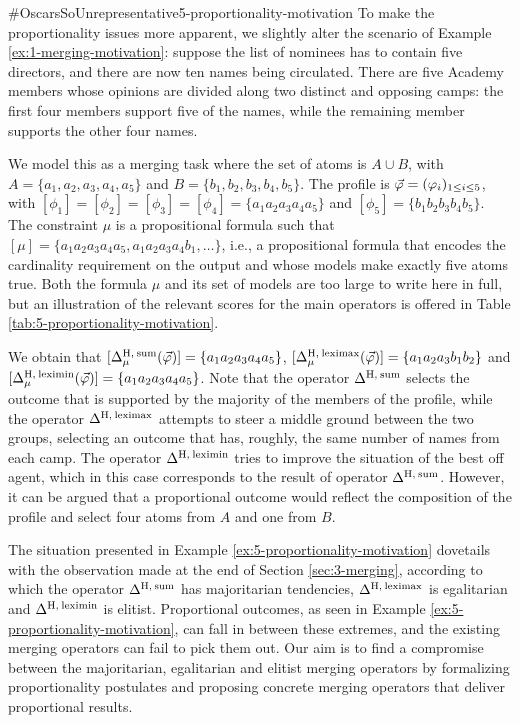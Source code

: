 \begin{xmpl}{$\#$OscarsSoUnrepresentative}{5-proportionality-motivation}
	To make the proportionality issues more apparent, 
	we slightly alter the scenario of Example \ref{ex:1-merging-motivation}: 
	suppose the list of nominees has to contain five directors, and there 
	are now ten names being circulated.
	There are five Academy members whose opinions
	are divided along two distinct and opposing camps:
	the first four members support five of the names,
	while the remaining member supports the other four names.

	We model this as a merging task where the set of atoms is $A\cup B$,
	with $A=\{a_1,a_2,a_3,a_4,a_5\}$ and $B=\{b_1,b_2,b_3,b_4,b_5\}$.
	The profile is $\P=(\phi_i)_{1\le i \le 5}$,
	with $[\phi_1]=[\phi_2]=[\phi_3]=[\phi_4]=\{a_1a_2a_3a_4a_5\}$
	and $[\phi_5]=\{b_1b_2b_3b_4b_5\}$.
	The constraint $\mu$ is a propositional formula 
	such that $[\mu]=\{a_1a_2a_3a_4a_5,a_1a_2a_3a_4b_1,\dots\}$,
	i.e., a propositional formula that encodes
	the cardinality requirement on the output and 
	whose models make exactly five atoms true.
	Both the formula $\mu$ and its set of models are too large 
	to write here in full, but an illustration of the relevant scores 
	for the main operators is offered in Table \ref{tab:5-proportionality-motivation}. 

	We obtain that
	$[\me^{\hamming,\:\ssum}_{\mu}(\P)]=\{a_1a_2a_3a_4a_5\}$,
	$[\me^{\hamming,\:\leximax}_{\mu}(\P)]=\{a_1a_2a_3b_1b_2\}$
	and 
	$[\me^{\hamming,\:\leximin}_{\mu}(\P)]=\{a_1a_2a_3a_4a_5\}$.
	Note that the operator $\me^{\hamming,\:\ssum}$ selects the outcome 
	that is supported by the majority of the members of the profile,
	while the operator $\me^{\hamming,\:\leximax}$ attempts to steer 
	a middle ground between the two groups, selecting an outcome
	that has, roughly, the same number of names from each camp.
	The operator $\me^{\hamming,\:\leximin}$ tries to improve
	the situation of the best off agent,
	which in this case corresponds to the result of operator 
	$\me^{\hamming,\:\ssum}$.
	However, it can be argued that a proportional outcome would 
	reflect the composition of the profile 
	and select four atoms from $A$ and one from $B$.
\end{xmpl}

The situation presented in Example \ref{ex:5-proportionality-motivation}
dovetails with the observation made at the end of Section \ref{sec:3-merging},
according to which the operator $\me^{\hamming,\:\ssum}$ has majoritarian tendencies,
$\me^{\hamming,\:\leximax}$ is egalitarian and $\me^{\hamming,\:\leximin}$ is elitist.
Proportional outcomes, as seen in Example \ref{ex:5-proportionality-motivation}, 
can fall in between these extremes,
and the existing merging operators can fail 
to pick them out.
Our aim is to find a compromise between the majoritarian, egalitarian
and elitist merging operators
by formalizing proportionality postulates and proposing 
concrete merging operators that deliver proportional results.

